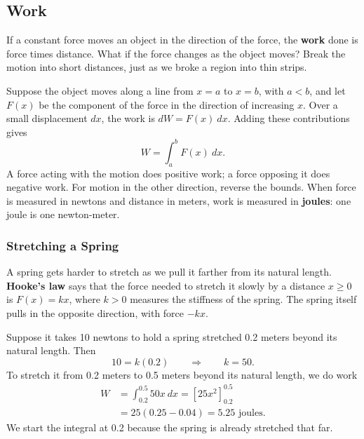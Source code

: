 


\subsection{Work}

If a constant force moves an object in the direction of the force, the
\textbf{work} done is force times distance. What if the force changes
as the object moves? Break the motion into short distances, just as we
broke a region into thin strips.

Suppose the object moves along a line from $x=a$ to $x=b$, with $a<b$,
and let $F(x)$ be the component of the force in the direction of
increasing $x$. Over a small displacement $dx$, the work is
$dW=F(x)\ dx$. Adding these contributions gives
$$W=\int_a^b F(x)\ dx.$$
A force acting with the motion does positive work; a force opposing it
does negative work. For motion in the other direction, reverse the
bounds. When force is measured in newtons and distance in meters, work
is measured in \textbf{joules}: one joule is one newton-meter.

\subsubsection{Stretching a Spring}

A spring gets harder to stretch as we pull it farther from its natural
length. \textbf{Hooke's law} says that the force needed to stretch it
slowly by a distance $x\geq0$ is $F(x)=kx$, where $k>0$ measures the
stiffness of the spring. The spring itself pulls in the opposite
direction, with force $-kx$.

\begin{exampleblock}
Suppose it takes 10 newtons to hold a spring stretched 0.2 meters beyond
its natural length. Then
$$10=k(0.2)\qquad\Longrightarrow\qquad k=50.$$
To stretch it from 0.2 meters to 0.5 meters beyond its natural length,
we do work
$$\begin{aligned}
W&=\int_{0.2}^{0.5}50x\ dx
  =\left[25x^2\right]_{0.2}^{0.5}\\
 &=25(0.25-0.04)=5.25\text{ joules}.
\end{aligned}$$
We start the integral at 0.2 because the spring is already stretched
that far.
\end{exampleblock}

